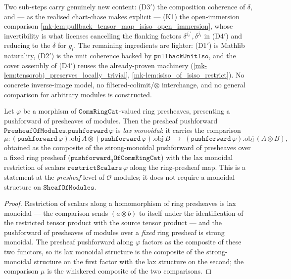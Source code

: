 Two sub-steps carry genuinely new content: (D3$'$) the composition coherence of
\(\delta\), and --- as the realised chart-chase makes explicit --- (K1) the
open-immersion comparison \ref{mk-lem:pullback_tensor_map_isiso_open_immersion}, whose
invertibility is what licenses cancelling the flanking factors \(\delta^{j_i'}, \delta^{j_i}\)
in (D4$'$) and reducing to the \(\delta\) for \(g_i\). The remaining ingredients are lighter:
(D1$'$) is Mathlib naturality, (D2$'$) is the unit coherence backed by
\(\mathtt{pullbackUnitIso}\), and the cover assembly of (D4$'$) reuses the already-proven
machinery (\ref{mk-lem:tensorobj_preserves_locally_trivial},
\ref{mk-lem:isiso_of_isiso_restrict}). No concrete inverse-image model, no
filtered-colimit/\(\otimes\) interchange, and no general comparison for arbitrary
modules is constructed.

\begin{lemma}\label{mk-lem:presheaf_pushforward_laxmonoidal}
  \leanok

  Let \(\varphi\) be a morphism of \(\mathtt{CommRingCat}\)-valued ring presheaves,
  presenting a pushforward of presheaves of modules. Then the presheaf pushforward
  \(\mathtt{PresheafOfModules.pushforward}\,\varphi\) is \emph{lax monoidal}: it
  carries the comparison
  \[
    \mu :
      (\mathtt{pushforward}\,\varphi).\mathrm{obj}\,A
        \otimes (\mathtt{pushforward}\,\varphi).\mathrm{obj}\,B
      \;\longrightarrow\;
      (\mathtt{pushforward}\,\varphi).\mathrm{obj}\,(A \otimes B),
  \]
  obtained as the composite of the strong-monoidal pushforward of presheaves over a
  fixed ring presheaf (\(\mathtt{pushforward}_0\mathtt{OfCommRingCat}\)) with the lax
  monoidal restriction of scalars \(\mathtt{restrictScalars}\,\varphi\) along the
  ring-presheaf map. This is a statement at the \emph{presheaf} level of
  \(\mathcal{O}\)-modules; it does not require a monoidal structure on
  \(\mathtt{SheafOfModules}\).
\end{lemma}

\begin{proof}
  \leanok


Restriction of scalars along a homomorphism of ring presheaves is lax monoidal --- the
  comparison sends \((a \otimes b)\) to itself under the identification of the
  restricted tensor product with the source tensor product --- and the pushforward of
  presheaves of modules over a \emph{fixed} ring presheaf is strong monoidal. The
  presheaf pushforward along \(\varphi\) factors as the composite of these two functors,
  so its lax monoidal structure is the composite of the strong-monoidal structure on the
  first factor with the lax structure on the second; the comparison \(\mu\) is the
  whiskered composite of the two comparisons.
\end{proof}

